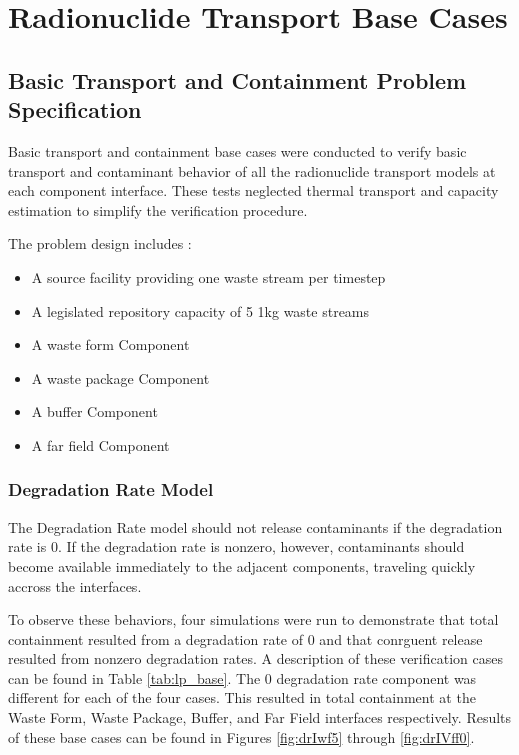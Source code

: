 \section{Radionuclide Transport Base Cases}\label{sec:nuclide_base_cases}
\subsection{Basic Transport and Containment Problem Specification}
Basic transport and containment base cases were conducted to verify basic 
transport and contaminant behavior of all the radionuclide transport models at 
each component interface. These tests neglected thermal transport and capacity 
estimation to simplify the verification procedure.  

The problem design includes : 
\begin{itemize}
\item{A source facility providing one waste stream per timestep}
\item{A legislated repository capacity of 5 1kg waste streams}
\item{A waste form Component} 
\item{A waste package Component}
\item{A buffer Component}
\item{A far field Component}
\end{itemize}

\subsubsection{Degradation Rate Model}
The Degradation Rate model should not release contaminants if the degradation 
rate is 0. If the degradation rate is nonzero, however, contaminants should 
become available immediately to the adjacent components, traveling quickly 
accross the interfaces. 

To observe these behaviors, four simulations were run to demonstrate that total 
containment resulted from a degradation rate of 0 and that conrguent release 
resulted from nonzero degradation rates. A description of these verification 
cases can be found in Table \ref{tab:lp_base}. The 0 degradation rate component was 
different for each of the four cases. This resulted in total containment at the 
Waste Form, Waste Package, Buffer, and Far Field interfaces respectively. 
Results of these base cases can be found in Figures 
\ref{fig:drIwf5} through \ref{fig:drIVff0}.



\FloatBarrier

